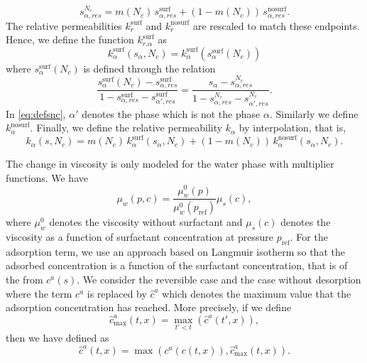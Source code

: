 \documentclass[11pt]{amsart}
\newcommand{\cads}{c^a}
\newcommand{\chatads}{\hat{c}^a}
\newcommand{\pref}{p_\text{ref}}
\newcommand{\surf}{\text{surf}}
\newcommand{\nosurf}{\text{nosurf}}
\begin{document}
\begin{equation}
  \label{eq:srhat}
  s_{\alpha,res}^{N_c} = m(N_c)\,s_{\alpha,res}^{\surf} + (1 - m(N_c))\,s_{\alpha,res}^{\nosurf}.
\end{equation}
The relative permeabilities $k_r^{\surf}$ and $k_r^{\nosurf}$ are rescaled to match these
endpoints. Hence, we define the function $k_{r.\alpha}^{\surf}$ as
\begin{equation}
\label{eq:rescaledkr}
k_{\alpha}^{\surf}(s_\alpha, N_c) = k_\alpha^{\surf}(s_\alpha^{\surf}(N_c))
\end{equation}
where $s_\alpha^{\surf}(N_c)$ is defined through the relation
\begin{equation}
  \label{eq:defsnc}
  \frac{s_\alpha^{\surf}(N_c) - s_{\alpha,res}^{\surf}}{1 - s_{\alpha,res}^{\surf} - s_{\alpha',res}^{\surf}} =   \frac{s_\alpha - s_{\alpha,res}^{N_c}}{1 - s_{\alpha,res}^{N_c} - s_{\alpha',res}^{N_c}}.
\end{equation}
In \eqref{eq:defsnc}, $\alpha'$ denotes the phase which is not the phase $\alpha$. Similarly we
define $k_{\alpha}^{\nosurf}$. Finally, we define the relative permeability $k_{\alpha}$ by
interpolation, that is,
\begin{equation}
  \label{eq:defkralpha}
  k_{\alpha}(s, N_c) = m(N_c)\,k_{\alpha}^{\surf}(s_\alpha, N_c) + (1 - m(N_c))\,k_{\alpha}^{\nosurf}(s_\alpha, N_c).
\end{equation}

The change in viscosity is only modeled for the water phase with multiplier functions. We have
\begin{equation}
  \label{eq:defmuw}
  \mu_w(p, c) = \frac{\mu_w^0(p)}{\mu_w^0(\pref)}\mu_{s}(c),
\end{equation}
where $\mu_w^0$ denotes the viscosity without surfactant and $\mu_s(c)$ denotes the viscosity as a
function of surfactant concentration at pressure $\pref$. For the adsorption term, we use an
approach based on Langmuir isotherm so that the adsorbed concentration is a function of the
surfactant concentration, that is of the from $\cads(s)$. We consider the reversible case and the
case without desorption where the term $\cads$ is replaced by $\hat\cads$ which denotes the
maximum value that the adsorption concentration has reached. More precisely, if we define
\begin{equation}
  \label{eq:chatadsmax}
  \chatads_{\max}(t,x) = \max_{t'<t}(\chatads(t',x)),
\end{equation}
then we have
defined as
\begin{equation}
  \label{eq:defchatads}
  \chatads(t, x) = \max(\cads(c(t,x)), \chatads_{\max}(t,x)).
\end{equation}
\end{document}

